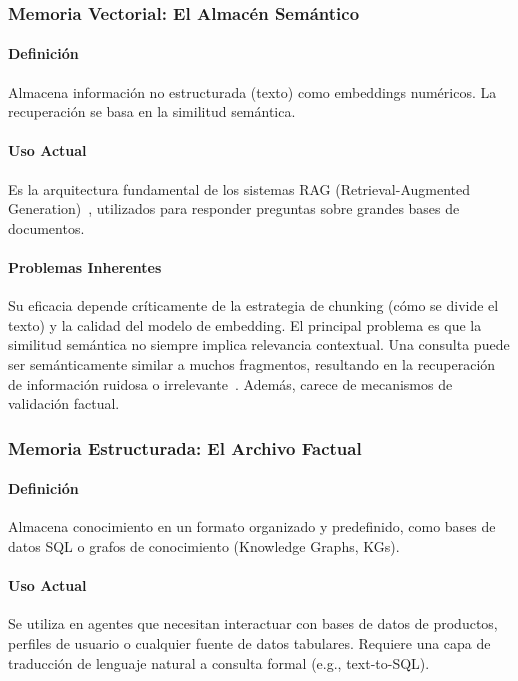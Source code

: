 \documentclass[conference]{IEEEtran}
\begin{document}
\subsubsection{Memoria Vectorial: El Almacén Semántico}
\paragraph{Definición} Almacena información no estructurada (texto) como embeddings numéricos. La recuperación se basa en la similitud semántica.

\paragraph{Uso Actual} Es la arquitectura fundamental de los sistemas RAG (Retrieval-Augmented Generation)~\cite{lewis2020retrieval}, utilizados para responder preguntas sobre grandes bases de documentos.

\paragraph{Problemas Inherentes} Su eficacia depende críticamente de la estrategia de chunking (cómo se divide el texto) y la calidad del modelo de embedding. El principal problema es que la similitud semántica no siempre implica relevancia contextual. Una consulta puede ser semánticamente similar a muchos fragmentos, resultando en la recuperación de información ruidosa o irrelevante~\cite{gao2023retrieval}. Además, carece de mecanismos de validación factual.

\subsubsection{Memoria Estructurada: El Archivo Factual}
\paragraph{Definición} Almacena conocimiento en un formato organizado y predefinido, como bases de datos SQL o grafos de conocimiento (Knowledge Graphs, KGs).

\paragraph{Uso Actual} Se utiliza en agentes que necesitan interactuar con bases de datos de productos, perfiles de usuario o cualquier fuente de datos tabulares. Requiere una capa de traducción de lenguaje natural a consulta formal (e.g., text-to-SQL).
\end{document}
